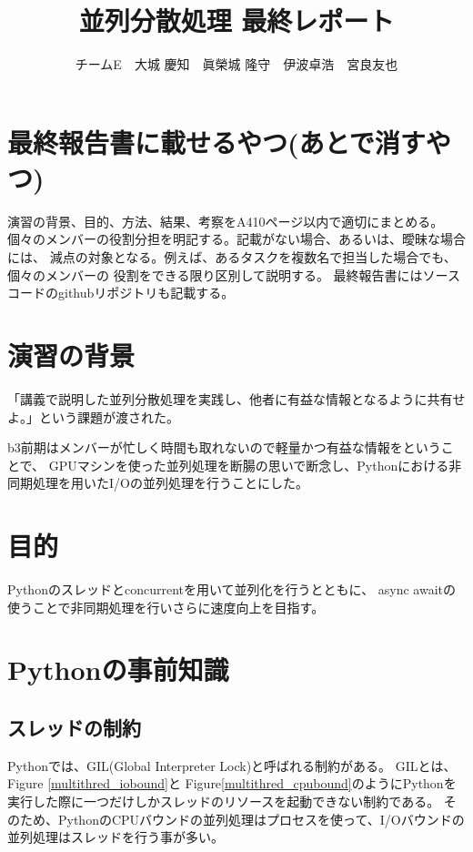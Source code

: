 \documentclass[14pt, oneside]{article}     	%
\title{並列分散処理  最終レポート}
\author{チームE　大城 慶知　眞榮城 隆守　伊波卓浩　宮良友也}
\begin{document}
\maketitle

\section*{最終報告書に載せるやつ(あとで消すやつ)}

演習の背景、目的、方法、結果、考察をA410ページ以内で適切にまとめる。
個々のメンバーの役割分担を明記する。記載がない場合、あるいは、曖昧な場合には、
減点の対象となる。例えば、あるタスクを複数名で担当した場合でも、個々のメンバーの
役割をできる限り区別して説明する。
最終報告書にはソースコードのgithubリポジトリも記載する。

\section{演習の背景}
「講義で説明した並列分散処理を実践し、他者に有益な情報となるように共有せよ。」という課題が渡された。

b3前期はメンバーが忙しく時間も取れないので軽量かつ有益な情報をということで、
GPUマシンを使った並列処理を断腸の思いで断念し、Pythonにおける非同期処理を用いたI/Oの並列処理を行うことにした。

\section{目的}
Pythonのスレッドとconcurrentを用いて並列化を行うとともに、
async awaitの使うことで非同期処理を行いさらに速度向上を目指す。

\section{Pythonの事前知識}

\subsection{スレッドの制約}
Pythonでは、GIL(Global Interpreter Lock)と呼ばれる制約がある。
GILとは、Figure \ref{multithred_iobound}と Figure\ref{multithred_cpubound}のようにPythonを実行した際に一つだけしかスレッドのリソースを起動できない制約である。
そのため、PythonのCPUバウンドの並列処理はプロセスを使って、I/Oバウンドの並列処理はスレッドを行う事が多い。
\end{document}
